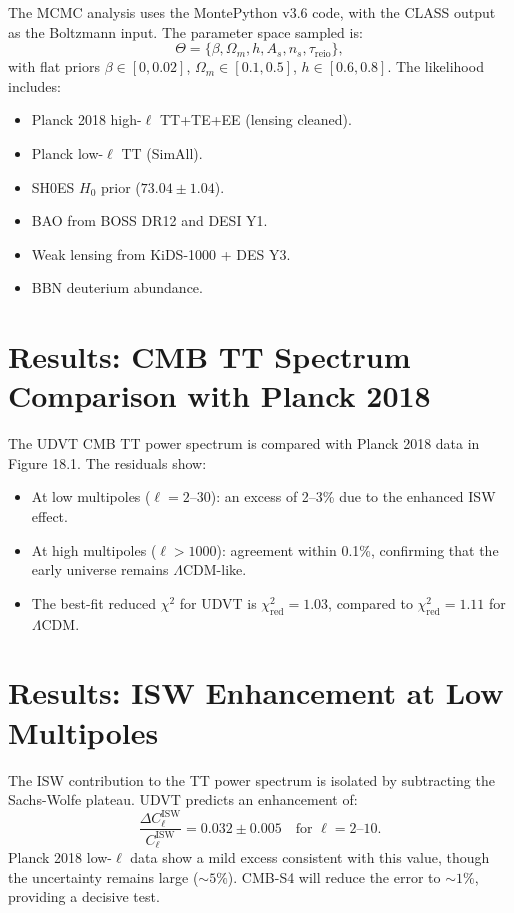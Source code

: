 \documentclass[12pt,a4paper]{book}
\theoremstyle{definition}
\theoremstyle{remark}
\begin{document}
The MCMC analysis uses the MontePython v3.6 code, with the CLASS output as the Boltzmann input. The parameter space sampled is:
\begin{equation}
    \Theta = \{\beta, \Omega_m, h, A_s, n_s, \tau_{\mathrm{reio}}\},
\end{equation}
with flat priors $\beta \in [0, 0.02]$, $\Omega_m \in [0.1, 0.5]$, $h \in [0.6, 0.8]$. The likelihood includes:
\begin{itemize}
    \item Planck 2018 high-$\ell$ TT+TE+EE (lensing cleaned).
    \item Planck low-$\ell$ TT (SimAll).
    \item SH0ES $H_0$ prior ($73.04 \pm 1.04$).
    \item BAO from BOSS DR12 and DESI Y1.
    \item Weak lensing from KiDS-1000 + DES Y3.
    \item BBN deuterium abundance.
\end{itemize}

\section{Results: CMB TT Spectrum Comparison with Planck 2018}

The UDVT CMB TT power spectrum is compared with Planck 2018 data in Figure 18.1. The residuals show:
\begin{itemize}
    \item At low multipoles ($\ell = 2$--$30$): an excess of 2--3\% due to the enhanced ISW effect.
    \item At high multipoles ($\ell > 1000$): agreement within 0.1\%, confirming that the early universe remains $\Lambda$CDM-like.
    \item The best-fit reduced $\chi^2$ for UDVT is $\chi^2_{\mathrm{red}} = 1.03$, compared to $\chi^2_{\mathrm{red}} = 1.11$ for $\Lambda$CDM.
\end{itemize}

\section{Results: ISW Enhancement at Low Multipoles}

The ISW contribution to the TT power spectrum is isolated by subtracting the Sachs-Wolfe plateau. UDVT predicts an enhancement of:
\begin{equation}
    \frac{\Delta C_\ell^{\mathrm{ISW}}}{C_\ell^{\mathrm{ISW}}} = 0.032 \pm 0.005 \quad \text{for } \ell = 2 \text{--} 10.
\end{equation}
Planck 2018 low-$\ell$ data show a mild excess consistent with this value, though the uncertainty remains large ($\sim 5\%$). CMB-S4 will reduce the error to $\sim 1\%$, providing a decisive test.
\end{document}
